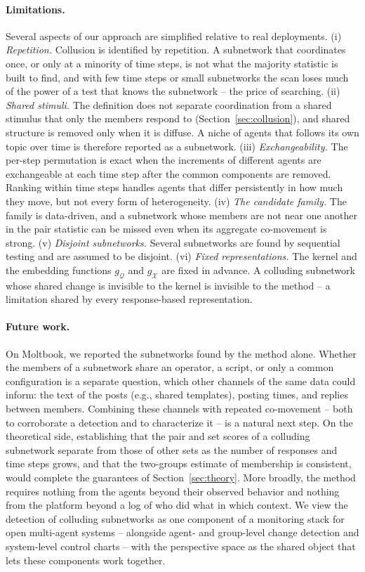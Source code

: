 \documentclass{article}
\theoremstyle{plain}
\theoremstyle{definition}
\newcommand{\Q}{\mathcal{Q}}
\newcommand{\X}{\mathcal{X}}
\begin{document}
\paragraph{Limitations.}
Several aspects of our approach are simplified relative to real deployments. (i) \emph{Repetition.} Collusion is identified by repetition. A subnetwork that coordinates once, or only at a minority of time steps, is not what the majority statistic is built to find, and with few time steps or small subnetworks the scan loses much of the power of a test that knows the subnetwork -- the price of searching. (ii) \emph{Shared stimuli.} The definition does not separate coordination from a shared stimulus that only the members respond to (Section~\ref{sec:collusion}), and shared structure is removed only when it is diffuse. A niche of agents that follows its own topic over time is therefore reported as a subnetwork. (iii) \emph{Exchangeability.} The per-step permutation is exact when the increments of different agents are exchangeable at each time step after the common components are removed. Ranking within time steps handles agents that differ persistently in how much they move, but not every form of heterogeneity. (iv) \emph{The candidate family.} The family is data-driven, and a subnetwork whose members are not near one another in the pair statistic can be missed even when its aggregate co-movement is strong. (v) \emph{Disjoint subnetworks.} Several subnetworks are found by sequential testing and are assumed to be disjoint. (vi) \emph{Fixed representations.} The kernel and the embedding functions $g_\Q$ and $g_\X$ are fixed in advance. A colluding subnetwork whose shared change is invisible to the kernel is invisible to the method -- a limitation shared by every response-based representation.

\paragraph{Future work.}
On Moltbook, we reported the subnetworks found by the method alone. Whether the members of a subnetwork share an operator, a script, or only a common configuration is a separate question, which other channels of the same data could inform: the text of the posts (e.g., shared templates), posting times, and replies between members. Combining these channels with repeated co-movement -- both to corroborate a detection and to characterize it -- is a natural next step. On the theoretical side, establishing that the pair and set scores of a colluding subnetwork separate from those of other sets as the number of responses and time steps grows, and that the two-groups estimate of membership is consistent, would complete the guarantees of Section~\ref{sec:theory}. More broadly, the method requires nothing from the agents beyond their observed behavior and nothing from the platform beyond a log of who did what in which context. We view the detection of colluding subnetworks as one component of a monitoring stack for open multi-agent systems -- alongside agent- and group-level change detection and system-level control charts -- with the perspective space as the shared object that lets these components work together.
\end{document}
